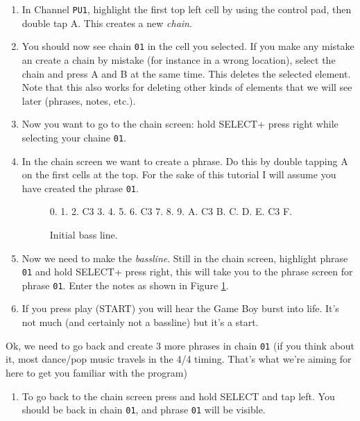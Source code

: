 \documentclass[]{article}
\newcommand{\buttonStyle}[1]{\textsf{#1}\xspace}
\newcommand{\bA}{\buttonStyle{A}}
\newcommand{\bB}{\buttonStyle{B}}
\newcommand{\bStart}{\buttonStyle{{START}}}
\newcommand{\bSelect}{\buttonStyle{{SELECT}}}
\newcommand{\bRight}{\buttonStyle{right}}
\newcommand{\bLeft}{\buttonStyle{left}}
\newcommand{\gbtxt}[1]{\texttt{#1}\xspace}
\begin{document}
\begin{enumerate}

\item In Channel \gbtxt{PU1}, highlight the first top left cell by using the control pad, then double tap \bA. This creates a new \textit{chain}. 

\item You should now see chain \gbtxt{01} in the cell you selected. If you make any mistake an create a chain by mistake (for instance in a wrong location), select the chain and press \bA and \bB at the same time. This deletes the selected element. Note that this also works for deleting other kinds of elements that we will see later (phrases, notes, etc.).

\item Now you want to go to the chain screen: hold \bSelect + press \bRight while selecting your chaine \gbtxt{01}.

\item In the chain screen we want to create a phrase. Do this by double tapping \bA on the first cells at the top. For the sake of this tutorial I will assume you have created the phrase \gbtxt{01}.

\begin{figure}
\begin{notes}
0.
1.
2. C3
3.
4.
5.
6. C3
7.
8.
9.
A. C3
B.
C.
D.
E. C3
F.
\end{notes}	
\caption{Initial bass line.}\label{bassline}
\end{figure}

\item Now we need to make the \textit{bassline}. Still in the chain screen, highlight phrase \gbtxt{01} and hold \bSelect + press \bRight, this will take you to the phrase screen for phrase \gbtxt{01}. Enter the notes as shown in Figure \ref{bassline}.


\item If you press play (\bStart) you will hear the Game Boy burst into life. It's not much (and certainly not a bassline) but it's a start.

\end{enumerate}

Ok, we need to go back and create 3 more phrases in chain \gbtxt{01} (if you think about it, most dance/pop music travels in the 4/4 timing. That's what we're aiming for here to get you familiar with the program) %

\begin{enumerate}[resume]


\item To go back to the chain screen press and hold \bSelect and tap \bLeft. You should be back in chain \gbtxt{01}, and phrase \gbtxt{01} will be visible.

\end{enumerate}
\end{document}
